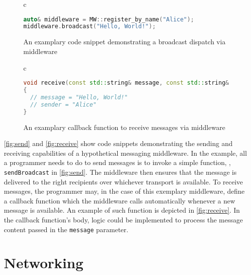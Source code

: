 \begin{figure}[htpb]
  \begin{tabular}{c}
  \begin{lstlisting}[language=C++]
auto& middleware = MW::register_by_name("Alice");
middleware.broadcast("Hello, World!");
  \end{lstlisting}
  \end{tabular}
  \caption[Middleware send example]{An examplary code snippet demonstrating a broadcast dispatch via middleware}\label{fig:send}
\end{figure}

\begin{figure}[htpb]
  \begin{tabular}{c}
  \begin{lstlisting}[language=C++]
void receive(const std::string& message, const std::string& sender) 
{ 
  // message = "Hello, World!"
  // sender = "Alice"    
}
  \end{lstlisting}
  \end{tabular}
  \caption[Middleware receive example]{An examplary callback function to receive messages via middleware}\label{fig:receive}
\end{figure}

\autoref{fig:send} and \autoref{fig:receive} show code snippets demonstrating the sending and receiving capabilities of a hypothetical messaging middleware. In the example, all a programmer needs to do to send messages is to invoke a simple function, \eg , \texttt{sendBroadcast} in \autoref{fig:send}. The middleware then ensures that the message is delivered to the right recipients over whichever transport is available. To receive messages, the programmer may, in the case of this exemplary middleware, define a callback function which the middleware calls automatically whenever a new message is available. An example of such function is depicted in \autoref{fig:receive}. In the callback function's body, logic could be implemented to process the message content passed in the \texttt{message} parameter.

%
%
%
%
%
%
%
%
%
%

\section{Networking}

